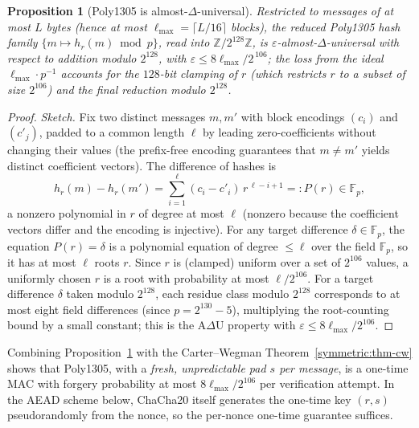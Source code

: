 \documentclass[11pt,a4paper]{article}
\newtheorem{proposition}[theorem]{Proposition}
\theoremstyle{definition}
\theoremstyle{remark}
\newcommand{\Z}{\ensuremath{\mathbb{Z}}}
\newcommand{\Fp}{\ensuremath{\mathbb{F}_{p}}}
\begin{document}
\begin{proposition}[Poly1305 is almost-\(\Delta\)-universal]\label{symmetric:prp-poly1305-axu}
Restricted to messages of at most \(L\) bytes (hence at most \(\ell_{\max} = \lceil L/16\rceil\) blocks), the reduced \textsf{Poly1305} hash family \(\{m \mapsto h_r(m) \bmod p\}\), read into \(\Z/2^{128}\Z\), is \(\varepsilon\)-almost-\(\Delta\)-universal with respect to addition modulo \(2^{128}\), with \(\varepsilon \le 8\ell_{\max}/2^{\,106}\); the loss from the ideal \(\ell_{\max} \cdot p^{-1}\) accounts for the \(128\)-bit clamping of \(r\) (which restricts \(r\) to a subset of size \(2^{106}\)) and the final reduction modulo \(2^{128}\).
\end{proposition}

\begin{proof}
\emph{Sketch.} Fix two distinct messages \(m, m'\) with block encodings \((c_i)\) and \((c'_j)\), padded to a common length \(\ell\) by leading zero-coefficients without changing their values (the prefix-free encoding guarantees that \(m \ne m'\) yields distinct coefficient vectors). The difference of hashes is
\[
  h_r(m) - h_r(m') = \sum_{i=1}^{\ell} (c_i - c'_i)\, r^{\,\ell - i + 1} =: P(r) \in \Fp,
\]
a nonzero polynomial in \(r\) of degree at most \(\ell\) (nonzero because the coefficient vectors differ and the encoding is injective). For any target difference \(\delta \in \Fp\), the equation \(P(r) = \delta\) is a polynomial equation of degree \(\le \ell\) over the field \(\Fp\), so it has at most \(\ell\) roots \(r\). Since \(r\) is (clamped) uniform over a set of \(2^{106}\) values, a uniformly chosen \(r\) is a root with probability at most \(\ell / 2^{106}\). For a target difference \(\delta\) taken modulo \(2^{128}\), each residue class modulo \(2^{128}\) corresponds to at most eight field differences (since \(p = 2^{130} - 5\)), multiplying the root-counting bound by a small constant; this is the A\(\Delta\)U property with \(\varepsilon \le 8\ell_{\max}/2^{106}\).
\end{proof}

Combining Proposition~\ref{symmetric:prp-poly1305-axu} with the Carter--Wegman Theorem~\ref{symmetric:thm-cw} shows that \textsf{Poly1305}, with a \emph{fresh, unpredictable pad \(s\) per message}, is a one-time MAC with forgery probability at most \(8\ell_{\max}/2^{106}\) per verification attempt. In the AEAD scheme below, \textsf{ChaCha20} itself generates the one-time key \((r,s)\) pseudorandomly from the nonce, so the per-nonce one-time guarantee suffices.
\end{document}
